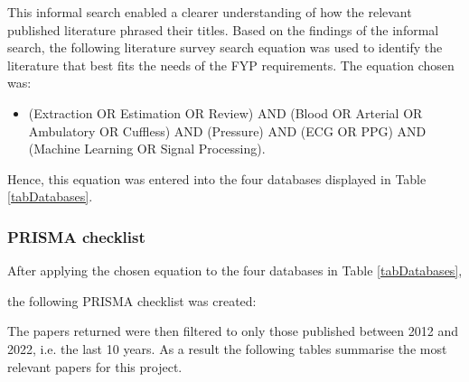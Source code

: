 \begin{table}[H]
    \centering
    \caption{Official online databases used to conduct the literature review \cite{databasesImperial}}
    \label{tabDatabases}
\end{table}\noindent This informal search enabled a clearer understanding of how the relevant published literature phrased their titles. Based on the findings of the informal search, the following 
literature survey search equation was used to identify the literature that best fits the needs of the FYP requirements. The equation chosen was: 

\begin{itemize}
        \item (Extraction OR Estimation OR Review) AND (Blood OR Arterial OR Ambulatory OR Cuffless) AND (Pressure) AND (ECG OR PPG) AND (Machine Learning OR Signal Processing).
\end{itemize}\noindent Hence, this equation was entered into the four databases displayed in Table \ref{tabDatabases}.


\subsubsection{PRISMA checklist}
After applying the chosen equation to the four databases in Table \ref{tabDatabases}, 


the following PRISMA checklist was created:

The papers returned were then filtered 
to only those published between 2012 and 2022, i.e. the last 10 years. As a result the following tables summarise 
the most relevant papers for this project.


